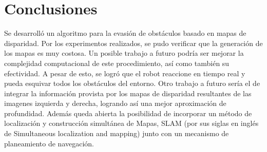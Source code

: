 \documentclass[journal]{IEEEtran}
\begin{document}
\section{Conclusiones}
\label{sec:conclusiones}
Se desarroll\'o un algoritmo para la evasi\'on de obst\'aculos basado en mapas de disparidad. Por los experimentos realizados, se pudo verificar que la generaci\'on de los mapas es muy costosa. Un posible trabajo a futuro podr\'ia ser mejorar la complejidad computacional de este procedimiento, as\'i como tambi\'en su efectividad. A pesar de esto, se logr\'o que el robot reaccione en tiempo real y pueda esquivar todos los obst\'aculos del entorno. Otro trabajo a futuro ser\'ia el de integrar la informaci\'on provista por los mapas de disparidad resultantes de las imagenes izquierda y derecha, logrando as\'i una mejor aproximaci\'on de profundidad. Adem\'as queda abierta la posibilidad de incorporar un m\'etodo de localizaci\'on y construcci\'on simult\'anea de Mapas, SLAM (por sus siglas en ingl\'es de Simultaneous localization and mapping) junto con un mecanismo de planeamiento de navegaci\'on.


\nocite{KNG10}
\nocite{G10}
\nocite{opencv}
\nocite{B00}
\nocite{H04}
\nocite{DPSC09}
\nocite{RH04}
\nocite{H09}




%
%

\end{document}
